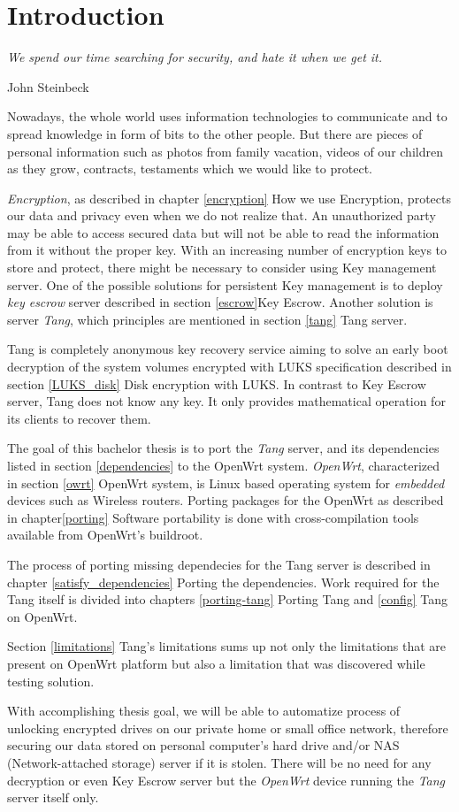 \chapter{Introduction}\label{introduction}
\epigraph{\it We spend our time searching for security, and hate it when we get it.}{{John Steinbeck}\cite{quote}}

Nowadays, the whole world uses information technologies to communicate and to spread knowledge in form of bits to the other people.
But there are pieces of personal information such as photos from family vacation, videos of our children as they grow, contracts, testaments which we would like to protect.

{\it Encryption}, as described in chapter \ref{encryption} How we use Encryption, protects our data and privacy even when we do not realize that.
An unauthorized party may be able to access secured data but will not be able to read the information from it without the proper key.
With an increasing number of encryption keys to store and protect, there might be necessary to consider using Key management server.
One of the possible solutions for persistent Key management is to deploy {\it key escrow} server described in section \ref{escrow}Key Escrow.
Another solution is server {\it Tang}, which principles are mentioned in section \ref{tang} Tang server.

Tang is completely anonymous key recovery service aiming to solve an early boot decryption of the system volumes encrypted with LUKS specification described in section \ref{LUKS_disk} Disk encryption with LUKS.
In contrast to Key Escrow server, Tang does not know any key.
It only provides mathematical operation for its clients to recover them.

The goal of this bachelor thesis is to port the {\it Tang} server, and its dependencies listed in section \ref{dependencies} to the OpenWrt system.
{\it OpenWrt}, characterized in section \ref{owrt} OpenWrt system, is Linux based operating system for {\it embedded} devices such as Wireless routers.
Porting packages for the OpenWrt as described in chapter\ref{porting} Software portability is done with cross-compilation tools available from OpenWrt's buildroot.

The process of porting missing dependecies for the Tang server is described in chapter \ref{satisfy_dependencies} Porting the dependencies.
Work required for the Tang itself is divided into chapters \ref{porting-tang} Porting Tang and \ref{config} Tang on OpenWrt.

Section \ref{limitations} Tang's limitations sums up not only the limitations that are present on OpenWrt platform but also a limitation that was discovered while testing solution.

With accomplishing thesis goal, we will be able to automatize process of unlocking encrypted drives on our private home or small office network, therefore securing our data stored on personal computer's hard drive and/or NAS (Network-attached storage) server if it is stolen.
There will be no need for any decryption or even Key Escrow server but the {\it OpenWrt} device running the {\it Tang} server itself only.
